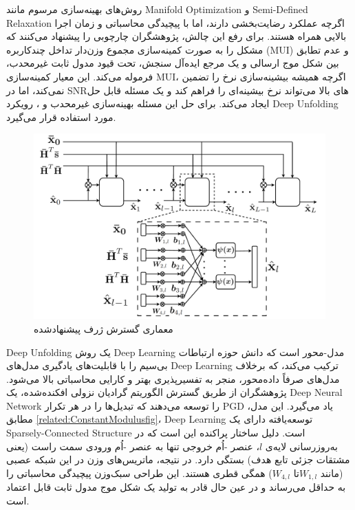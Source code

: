 	   روش‌های بهینه‌سازی مرسوم مانند 
\gls{Manifold Optimization}
	    و 
\gls{Semi-Defined Relaxation}
	   اگرچه عملکرد رضایت‌بخشی دارند، اما با پیچیدگی محاسباتی و زمان اجرا بالایی همراه هستند.
	برای رفع این چالش، پژوهشگران چارچوبی را پیشنهاد می‌کنند که مشکل را به صورت کمینه‌سازی مجموع وزن‌دار تداخل چندکاربره 
(\gls{MUI})
	 و عدم تطابق بین شکل موج ارسالی و یک مرجع ایده‌آل سنجش، تحت قیود مدول ثابت غیرمحدب، فرموله می‌کند. این معیار کمینه‌سازی 
\gls{MUI}،
	  اگرچه همیشه بیشینه‌سازی نرخ را تضمین نمی‌کند، اما در 
\gls{SNR}های
	  بالا می‌تواند نرخ بیشینه‌ای را فراهم کند و یک مسئله قابل حل ایجاد می‌کند.
	برای حل این مسئله بهینه‌سازی غیرمحدب و 
،
	 رویکرد 
\gls{Deep Unfolding}
	   مورد استفاده قرار می‌گیرد.
 \begin{figure}
    	\centering
    	\includegraphics[width=0.7\linewidth]{./Pic/ConstantModulus_fig}
    	\caption[ معماری گسترش ژرف پیشنهاد‌شده]{معماری گسترش ژرف پیشنهاد‌شده \cite{ConstantModulus}}
    		\label{related:ConstantModulusfig}
\end{figure}
\gls{Deep Unfolding}
	    یک روش 
\gls{Deep Learning}
	مدل-محور است که دانش حوزه ارتباطات بی‌سیم را با قابلیت‌های یادگیری مدل‌های 
\gls{Deep Learning}
	ترکیب می‌کند، که برخلاف مدل‌های صرفاً داده‌محور، منجر به تفسیرپذیری بهتر و کارایی محاسباتی بالا می‌شود. پژوهشگران از طریق گسترش الگوریتم گرادیان نزولی افکنده‌شده، یک 
\gls{Deep Neural Network}
	 را توسعه می‌دهند که تبدیل‌ها را در هر تکرار PGD یاد می‌گیرد.
	این مدل، مطابق 
\autoref{related:ConstantModulusfig}،
\gls{Deep Learning}
	توسعه‌یافته دارای یک 
\gls{Sparsely-Connected Structure}
	  است. دلیل ساختار پراکنده این است که در به‌روزرسانی لایه‌ی 
$l$،
	   عنصر 
-اُم
	    خروجی تنها به عنصر
-اُم
	    ورودی سمت راست (یعنی مشتقات جزئی تابع هدف) بستگی دارد. در نتیجه، ماتریس‌های وزن در این شبکه عصبی (مانند
$W_{1,l}$	​
	تا
$W_{4,l}$)
همگی قطری هستند. این طراحی سبک‌وزن پیچیدگی محاسباتی را به حداقل می‌رساند و در عین حال قادر به تولید یک شکل موج مدول ثابت قابل اعتماد است. 

